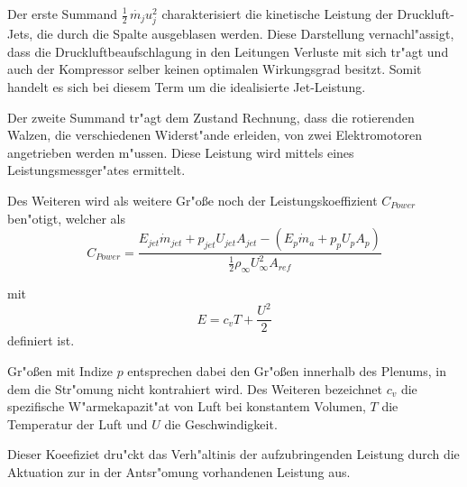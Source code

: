Der erste Summand $\frac{1}{2}\,\dot{m_j} u_j^2$ charakterisiert die kinetische Leistung der Druckluft-Jets, die durch die Spalte ausgeblasen werden. Diese Darstellung vernachl"assigt, dass die  Druckluftbeaufschlagung in den Leitungen Verluste mit sich tr"agt und auch der Kompressor selber keinen optimalen Wirkungsgrad besitzt. Somit handelt es sich bei diesem Term um die idealisierte Jet-Leistung.

Der zweite Summand tr"agt dem Zustand Rechnung, dass die rotierenden Walzen, die verschiedenen Widerst"ande erleiden, von zwei Elektromotoren angetrieben werden m"ussen.
Diese Leistung wird mittels eines Leistungsmessger"ates ermittelt.


Des Weiteren wird als weitere Gr"o\ss{}e noch der Leistungskoeffizient $C_{Power}$ ben"otigt, welcher als
\begin{equation}
	\label{eq:def-powercoefficient}
	C_{Power} = \frac{E_{jet}\dot{m}_{jet} + p_{jet}U_{jet}A_{jet} - (E_p\dot{m}_a + p_p U_p A_p)}{\frac{1}{2}\rho_{\infty}U^2_{\infty} A_{ref}}
\end{equation}

mit
\begin{equation}
	\label{eq:def-energieterm}
	E = c_vT + \frac{U^2}{2}
\end{equation}		
definiert ist.

Gr"o\ss{}en mit Indize $p$ entsprechen dabei den Gr"o\ss{}en innerhalb des Plenums, in dem die Str"omung nicht kontrahiert wird.
Des Weiteren bezeichnet $c_v$ die spezifische W"armekapazit"at von Luft bei konstantem Volumen, $T$ die Temperatur der Luft und $U$ die Geschwindigkeit.

Dieser Koeefiziet dru"ckt das Verh"altinis der aufzubringenden Leistung durch die Aktuation zur in der Antsr"omung vorhandenen Leistung aus.


